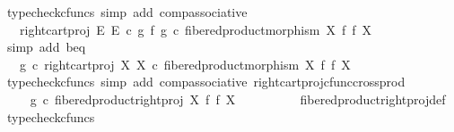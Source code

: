 \begin{isabellebody}
\ {\isacharparenleft}{\kern0pt}typecheck{\isacharunderscore}{\kern0pt}cfuncs{\isacharcomma}{\kern0pt}\ simp\ add{\isacharcolon}{\kern0pt}\ comp{\isacharunderscore}{\kern0pt}associative{}{\isacharparenright}{\kern0pt}\isanewline
\ \ \ \ \ \ \isamarkupfalse%
\ \isamarkupfalse%
\ {\isachardoublequoteopen}{\isachardot}{\kern0pt}{\isachardot}{\kern0pt}{\isachardot}{\kern0pt}\ {\isacharequal}{\kern0pt}\ right{\isacharunderscore}{\kern0pt}cart{\isacharunderscore}{\kern0pt}proj\ E\ E\ {\isasymcirc}\isactrlsub c\ {\isacharparenleft}{\kern0pt}g\ {\isasymtimes}\isactrlsub f\ g{\isacharparenright}{\kern0pt}\ {\isasymcirc}\isactrlsub c\ fibered{\isacharunderscore}{\kern0pt}product{\isacharunderscore}{\kern0pt}morphism\ X\ f\ f\ X{\isachardoublequoteclose}\isanewline
\ \ \ \ \ \ \ \ \isamarkupfalse%
\ {\isacharparenleft}{\kern0pt}simp\ add{\isacharcolon}{\kern0pt}\ b{\isacharunderscore}{\kern0pt}eq{\isacharparenright}{\kern0pt}\isanewline
\ \ \ \ \ \ \isamarkupfalse%
\ \isamarkupfalse%
\ {\isachardoublequoteopen}{\isachardot}{\kern0pt}{\isachardot}{\kern0pt}{\isachardot}{\kern0pt}\ {\isacharequal}{\kern0pt}\ g\ {\isasymcirc}\isactrlsub c\ right{\isacharunderscore}{\kern0pt}cart{\isacharunderscore}{\kern0pt}proj\ X\ X\ {\isasymcirc}\isactrlsub c\ fibered{\isacharunderscore}{\kern0pt}product{\isacharunderscore}{\kern0pt}morphism\ X\ f\ f\ X{\isachardoublequoteclose}\isanewline
\ \ \ \ \ \ \ \ \isamarkupfalse%
\ {\isacharparenleft}{\kern0pt}typecheck{\isacharunderscore}{\kern0pt}cfuncs{\isacharcomma}{\kern0pt}\ simp\ add{\isacharcolon}{\kern0pt}\ comp{\isacharunderscore}{\kern0pt}associative{}\ right{\isacharunderscore}{\kern0pt}cart{\isacharunderscore}{\kern0pt}proj{\isacharunderscore}{\kern0pt}cfunc{\isacharunderscore}{\kern0pt}cross{\isacharunderscore}{\kern0pt}prod{\isacharparenright}{\kern0pt}\isanewline
\ \ \ \ \ \ \isamarkupfalse%
\ \isamarkupfalse%
\ {\isachardoublequoteopen}{\isachardot}{\kern0pt}{\isachardot}{\kern0pt}{\isachardot}{\kern0pt}\ {\isacharequal}{\kern0pt}\ g\ {\isasymcirc}\isactrlsub c\ fibered{\isacharunderscore}{\kern0pt}product{\isacharunderscore}{\kern0pt}right{\isacharunderscore}{\kern0pt}proj\ X\ f\ f\ X{\isachardoublequoteclose}\isanewline
\ \ \ \ \ \ \ \ \isamarkupfalse%
\ fibered{\isacharunderscore}{\kern0pt}product{\isacharunderscore}{\kern0pt}right{\isacharunderscore}{\kern0pt}proj{\isacharunderscore}{\kern0pt}def\ \isamarkupfalse%
\ {\isacharparenleft}{\kern0pt}typecheck{\isacharunderscore}{\kern0pt}cfuncs{\isacharparenright}{\kern0pt}\isanewline

\end{isabellebody}
